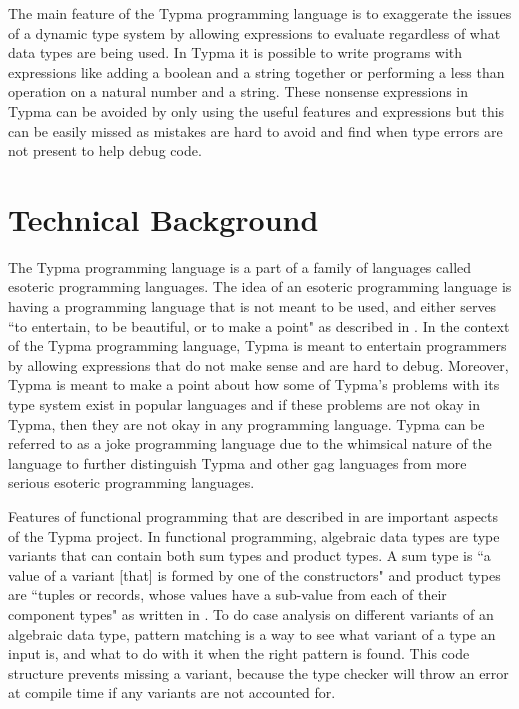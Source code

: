 \documentclass[10pt,twocolumn]{article}
\begin{document}
The main feature of the Typma programming language is to exaggerate the issues of a dynamic type system by allowing expressions to evaluate regardless of what data types are being used. In Typma it is possible to write programs with expressions like adding a boolean and a string together or performing a less than operation on a natural number and a string. These nonsense expressions in Typma can be avoided by only using the useful features and expressions but this can be easily missed as mistakes are hard to avoid and find when type errors are not present to help debug code.

\section{Technical Background}

The Typma programming language is a part of a family of languages called esoteric programming languages. The idea of an esoteric programming language is having a programming language that is not meant to be used, and either serves ``to entertain, to be beautiful, or to make a point" as described in \textcite{Morr2014Esoteric}. In the context of the Typma programming language, Typma is meant to entertain programmers by allowing expressions that do not make sense and are hard to debug. Moreover, Typma is meant to make a point about how some of Typma's problems with its type system exist in popular languages and if these problems are not okay in Typma, then they are not okay in any programming language. Typma can be referred to as a joke programming language due to the whimsical nature of the language to further distinguish Typma and other gag languages from more serious esoteric programming languages.

Features of functional programming that are described in \textcite{OCaml} are important aspects of the Typma project. In functional programming, algebraic data types are type variants that can contain both sum types and product types. A sum type is ``a value of a variant [that] is formed by one of the constructors" and product types are ``tuples or records, whose values have a sub-value from each of their component types" as written in \textcite{OCaml}. To do case analysis on different variants of an algebraic data type, pattern matching is a way to see what variant of a type an input is, and what to do with it when the right pattern is found. This code structure prevents missing a variant, because the type checker will throw an error at compile time if any variants are not accounted for.
\end{document}
